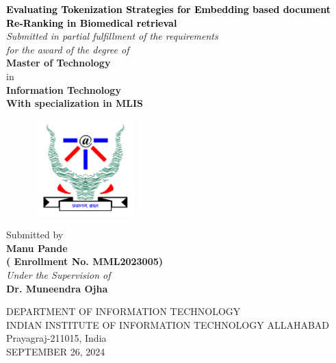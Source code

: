 \newpage
\thispagestyle{empty}
\graphicspath{{Figures/PNG/}{Figures/}}
\begin{center}
	\vspace{8mm}
	\huge \textcolor{black}{\textbf{Evaluating Tokenization Strategies for Embedding based document Re-Ranking in Biomedical retrieval 
	}} \\
	\vspace{10mm}
	\large \textit{Submitted in partial fulfillment of the requirements \\ for the award of the degree of} \\
	\vspace{10mm}
	\Large {\textbf{Master of Technology}} \\
        \large in \\
        \Large {\textbf{Information Technology}} \\
	\Large {\textbf{With specialization in MLIS}} \\
    \begin{figure}[h!]
		\centering
		\includegraphics[height=3.7cm,width=4cm]{IMAGE/IIITAlogo.png}
	\end{figure}
    \vspace{10mm}
    \large Submitted by \\
    \vspace{6mm}
	\textbf{{\Large Manu Pande} \\ {\large ( Enrollment No. MML2023005)}} \\
	\vspace{6mm}
	\emph{Under the Supervision of }\\
    \textbf{Dr. Muneendra Ojha}  \\
    \vspace{4mm}
	\par\vspace{1mm}
 \vspace{15mm}
	\large {DEPARTMENT OF INFORMATION TECHNOLOGY\\
	INDIAN INSTITUTE OF INFORMATION TECHNOLOGY ALLAHABAD\\
			Prayagraj-211015, India\\
    \vspace{5mm}
    SEPTEMBER 26, 2024}
\end{center}

